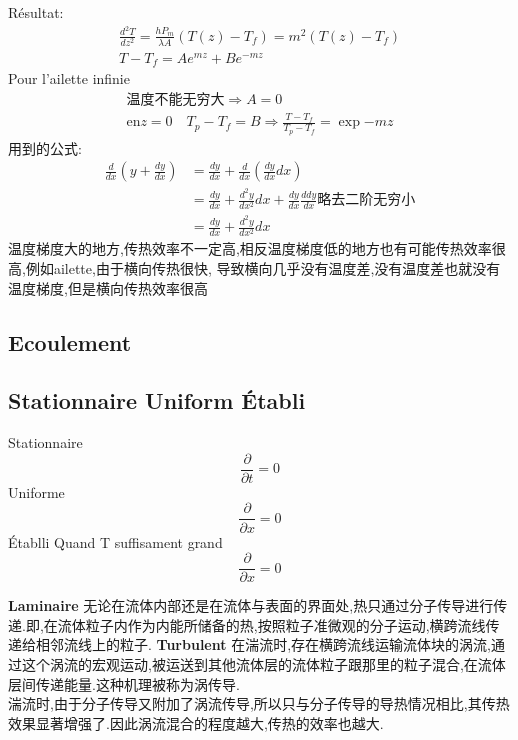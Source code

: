 \documentclass[openany]{book}
\begin{document}
R\'esultat:
\begin{equation}
	\begin{split}
	\frac{ d^2T}{dz^2}=\frac{ hP_m}{\lambda A}(T(z)-T_f)=m^2(T(z)-T_f) \\
	 T-T_f=A e^{mz} + B e^{-mz}
	\end{split}
\end{equation}
Pour l'ailette infinie
\begin{equation}
	\begin{split}
	  \text{温度不能无穷大}\Rightarrow A=0 \\
	  \text{en} z=0 \quad T_p - T_f =B \Rightarrow \frac{T-T_f}{T_p - T_f}=\exp{-mz}
	\end{split}
\end{equation}
用到的公式:
\begin{equation}
	\begin{split}
	 \frac{ d}{dx}(y+\frac{dy}{dx}) & = \frac{ dy}{dx}+\frac{ d}{dx}(\frac{ dy}{dx}dx) \\
	 & = \frac{ dy}{dx}+\frac{d^2y}{dx^2}dx + \frac{ dy}{dx}\frac{ ddy}{dx} \text{略去二阶无穷小} \\
	 & = \frac{ dy}{dx}+\frac{ d^2y}{dx^2}dx
	\end{split}
\end{equation}
温度梯度大的地方,传热效率不一定高,相反温度梯度低的地方也有可能传热效率很高,例如ailette,由于横向传热很快,
导致横向几乎没有温度差,没有温度差也就没有温度梯度,但是横向传热效率很高

\subsection{Ecoulement}
\subsection{Stationnaire Uniform \'Etabli}
Stationnaire
$$ \frac{\partial  }{\partial t}=0 $$
Uniforme
$$ \frac{\partial  }{\partial x}=0 $$
\'Etablli
Quand T suffisament grand
$$ \frac{\partial  }{\partial x}=0 $$


\textbf{Laminaire}
无论在流体内部还是在流体与表面的界面处,热只通过分子传导进行传递.即,在流体粒子内作为内能所储备的热,按照粒子准微观的分子运动,横跨流线传递给相邻流线上的粒子.
\textbf{Turbulent}
在湍流时,存在横跨流线运输流体块的涡流,通过这个涡流的宏观运动,被运送到其他流体层的流体粒子跟那里的粒子混合,在流体层间传递能量.这种机理被称为涡传导.\\
湍流时,由于分子传导又附加了涡流传导,所以只与分子传导的导热情况相比,其传热效果显著增强了.因此涡流混合的程度越大,传热的效率也越大.
\end{document}

